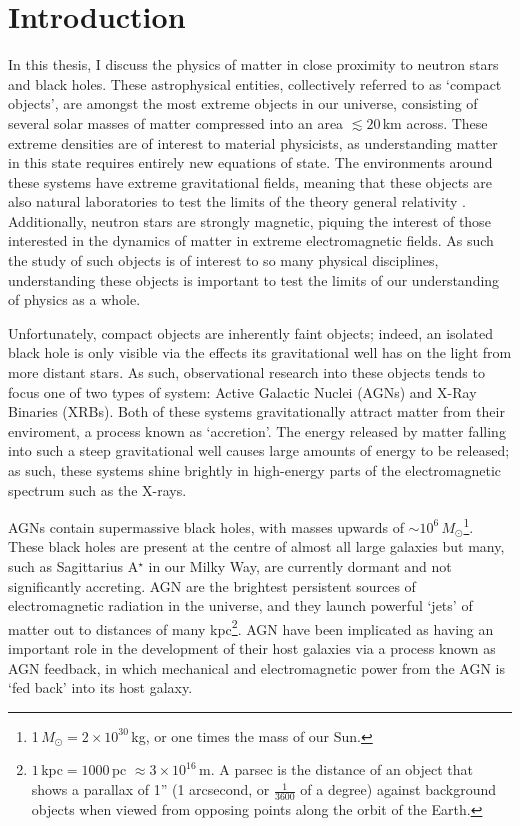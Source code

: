 \chapter{Introduction}

\par In this thesis, I discuss the physics of matter in close proximity to neutron stars and black holes.  These astrophysical entities, collectively referred to as `compact objects',  are amongst the most extreme objects in our universe, consisting of several solar masses of matter compressed into an area $\lesssim20$\,km across.  These extreme densities are of interest to material physicists, as understanding matter in this state requires entirely new equations of state.  The environments around these systems have extreme gravitational fields, meaning that these objects are also natural laboratories to test the limits of the theory general relativity \citep{Einstein_GR}.  Additionally, neutron stars are strongly magnetic, piquing the interest of those interested in the dynamics of matter in extreme electromagnetic fields.  As such the study of such objects is of interest to so many physical disciplines, understanding these objects is important to test the limits of our understanding of physics as a whole.
\par Unfortunately, compact objects are inherently faint objects; indeed, an isolated black hole is only visible via the effects its gravitational well has on the light from more distant stars.  As such, observational research into these objects tends to focus one of two types of system: Active Galactic Nuclei (AGNs) and X-Ray Binaries (XRBs).  Both of these systems gravitationally attract matter from their enviroment, a process known as `accretion'.  The energy released by matter falling into such a steep gravitational well causes large amounts of energy to be released; as such, these systems shine brightly in high-energy parts of the electromagnetic spectrum such as the X-rays.
\par AGNs contain supermassive black holes, with masses upwards of $\sim10^6$\,$M_\odot$\footnote{1\,$M_\odot=2\times10^{30}$\,kg, or one times the mass of our Sun.}.  These black holes are present at the centre of almost all large galaxies but many, such as Sagittarius A$^\star$ in our Milky Way, are currently dormant and not significantly accreting.  AGN are the brightest persistent sources of electromagnetic radiation in the universe, and they launch powerful `jets' of matter out to distances of many kpc\footnote{$1$\,kpc$ =1000$\,pc $\approx3\times10^{16}$\,m.  A parsec is the distance of an object that shows a parallax of 1'' (1 arcsecond, or $\frac{1}{3600}$ of a degree) against background objects when viewed from opposing points along the orbit of the Earth.}.  AGN have been implicated as having an important role in the development of their host galaxies via a process known as AGN feedback, in which mechanical and electromagnetic power from the AGN is `fed back' into its host galaxy.
